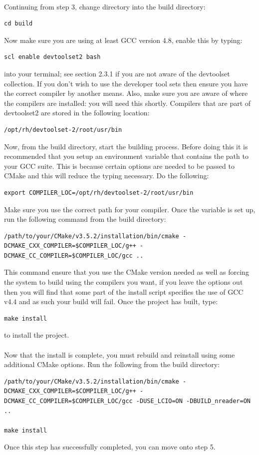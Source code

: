 \documentclass[11pt]{article}
\begin{document}
\paragraph{}
Continuing from step 3, change directory into the build directory:
\begin{verbatim}
cd build
\end{verbatim}
Now make sure you are using at least GCC version 4.8, enable this by typing:
\begin{verbatim}
scl enable devtoolset2 bash
\end{verbatim}
into your terminal; see section 2.3.1 if you are not aware of the devtoolset collection. If you don't wish to use the developer tool sets then ensure you have the correct compiler by another means. Also, make sure you are aware of where the compilers are installed: you will need this shortly. Compilers that are part of devtoolset2 are stored in the following location:
\begin{verbatim}
/opt/rh/devtoolset-2/root/usr/bin
\end{verbatim}
Now, from the build directory, start the building process. Before doing this it is recommended that you setup an environment variable that contains the path to your GCC suite. This is because certain options are needed to be passed to CMake and this will reduce the typing necessary. Do the following:
\begin{verbatim}
export COMPILER_LOC=/opt/rh/devtoolset-2/root/usr/bin
\end{verbatim}
Make sure you use the correct path for your compiler. Once the variable is set up, run the following command from the build directory:
\begin{verbatim}
/path/to/your/CMake/v3.5.2/installation/bin/cmake -DCMAKE_CXX_COMPILER=$COMPILER_LOC/g++ -DCMAKE_CC_COMPILER=$COMPILER_LOC/gcc ..
\end{verbatim}
This command ensure that you use the CMake version needed as well as forcing the system to build using the compilers you want, if you leave the options out then you will find that some part of the install script specifies the use of GCC v4.4 and as such your build will fail. Once the project has built, type:
\begin{verbatim}
make install
\end{verbatim}
to install the project.
\paragraph{}
Now that the install is complete, you must rebuild and reinstall using some additional CMake options. Run the following from the build directory:
\begin{verbatim}
/path/to/your/CMake/v3.5.2/installation/bin/cmake -DCMAKE_CXX_COMPILER=$COMPILER_LOC/g++ -DCMAKE_CC_COMPILER=$COMPILER_LOC/gcc -DUSE_LCIO=ON -DBUILD_nreader=ON ..

make install
\end{verbatim}
Once this step has successfully completed, you can move onto step 5.
\end{document}
